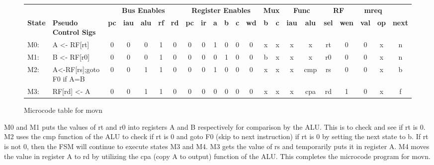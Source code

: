 \documentclass[10pt]{article}
\begin{document}
\begin{figure}[H]
\centering
{\setlength{\tabcolsep}{2pt}
\begin{tabular}{@{\extracolsep{3pt}}llcccccccccccccccccccc@{}}
\hline
& & \multicolumn{5}{c}{\textbf{Bus Enables}}
& \multicolumn{6}{c}{\textbf{Register Enables}}
& \multicolumn{2}{c}{\textbf{Mux}}
& \multicolumn{2}{c}{\textbf{Func}}
& \multicolumn{2}{c}{\textbf{RF}}
& \multicolumn{2}{c}{\textbf{mreq}}\\
\cline{3-7} 
\cline{8-13}
\cline{14-15}
\cline{16-17}
\cline{18-19}
\cline{20-21} 
\textbf{State} & \textbf{Pseudo Control Sigs} & \textbf{pc} & \textbf{iau} & \textbf{alu} & \textbf{rf} & \textbf{rd} & \textbf{pc} & \textbf{ir} & \textbf{a} & \textbf{b} & \textbf{c} & \textbf{wd} & \textbf{b} & \textbf{c} & \textbf{iau} & \textbf{alu} & \textbf{sel} & \textbf{wen} & \textbf{val} & \textbf{op} & \textbf{next} \\
\hline
M0: & A <- RF[rt] &0&0&0&1&0&0&0&1&0&0&0&x&x&x&x&rt&0&0&x&n \\
\hline
M1: & B <- RF[r0] &0&0&0&1&0&0&0&0&1&0&0&b&x&x&x&r0&0&0&x&n\\
\hline
M2: & A<-RF[rs];goto F0 if A=B &0&0&1&1&0&0&0&1&0&0&0&x&x&x&cmp&rs&0&0&x&b\\
\hline
M3: & RF[rd] <- A &0&0&1&1&0&0&0&0&0&0&0&x&x&x&cpa&rd&1&0&x&f\\
\hline
\end{tabular}
}
\caption{Microcode table for movn}
\label{fig:conditional_move}
\end{figure}
M0 and M1 puts the values of rt and r0 into registers A and B respectively for comparison by the ALU. This is to check and see if rt is 0. M2 uses the cmp function of the ALU to check if rt is 0 and goto F0 (skip to next instruction) if rt is 0 by setting the next state to b. If rt is not 0, then the FSM will continue to execute states M3 and M4. M3 gets the value of rs and temporarily puts it in register A. M4 moves the value in register A to rd by utilizing the cpa (copy A to output) function of the ALU. This completes the microcode program for movn.
\end{document}
